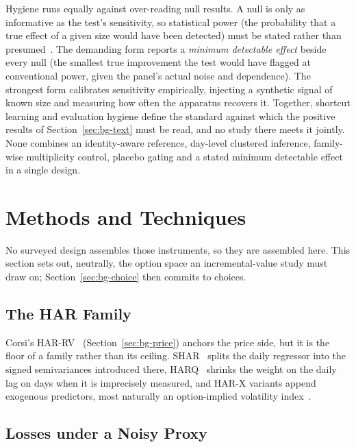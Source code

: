 Hygiene runs equally against over-reading null results. A null is only as informative as the test's sensitivity, so statistical power (the probability that a true effect of a given size would have been detected) must be stated rather than presumed~\cite{cohen1988power}. The demanding form reports a \emph{minimum detectable effect} beside every null (the smallest true improvement the test would have flagged at conventional power, given the panel's actual noise and dependence). The strongest form calibrates sensitivity empirically, injecting a synthetic signal of known size and measuring how often the apparatus recovers it. Together, shortcut learning and evaluation hygiene define the standard against which the positive results of Section~\ref{sec:bg-text} must be read, and no study there meets it jointly. None combines an identity-aware reference, day-level clustered inference, family-wise multiplicity control, placebo gating and a stated minimum detectable effect in a single design.

\section{Methods and Techniques}
\label{sec:bg-methods}

No surveyed design assembles those instruments, so they are assembled here. This section sets out, neutrally, the option space an incremental-value study must draw on; Section~\ref{sec:bg-choice} then commits to choices.

\subsection{The HAR Family}
\label{sec:bg-methods-har}

Corsi's HAR-RV~\cite{corsi2009har} (Section~\ref{sec:bg-price}) anchors the price side, but it is the floor of a family rather than its ceiling. SHAR~\cite{pattonsheppard2015shar} splits the daily regressor into the signed semivariances introduced there, HARQ~\cite{bollerslev2016harq} shrinks the weight on the daily lag on days when it is imprecisely measured, and HAR-X variants append exogenous predictors, most naturally an option-implied volatility index~\cite{blair2001forecasting}.

\subsection{Losses under a Noisy Proxy}
\label{sec:bg-methods-loss}

